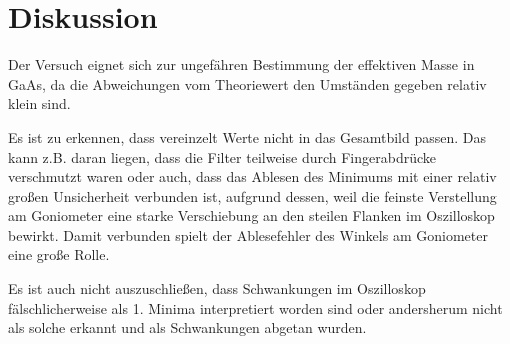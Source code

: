 \section{Diskussion}
    Der Versuch eignet sich zur ungefähren Bestimmung der effektiven Masse in GaAs, da die Abweichungen vom Theoriewert den Umständen gegeben relativ klein sind.

    Es ist zu erkennen, dass vereinzelt Werte nicht in das Gesamtbild passen. Das kann z.B. daran liegen, dass die Filter teilweise durch Fingerabdrücke verschmutzt waren oder auch, dass das Ablesen des Minimums mit einer relativ großen Unsicherheit verbunden ist, aufgrund dessen, weil die feinste Verstellung am Goniometer eine starke Verschiebung an den steilen Flanken im Oszilloskop bewirkt.
    Damit verbunden spielt der Ablesefehler des Winkels am Goniometer eine große Rolle.

    Es ist auch nicht auszuschließen, dass Schwankungen im Oszilloskop fälschlicherweise als 1. Minima interpretiert worden sind oder andersherum nicht als solche erkannt und als Schwankungen abgetan wurden.